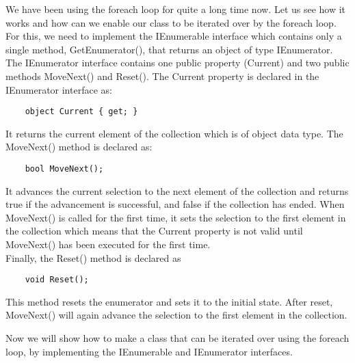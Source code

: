 We have been using the foreach loop for quite a long time now. Let us see how it works and how can we enable our
class to be iterated over by the foreach loop. For this, we need to implement the IEnumerable interface which
contains only a single method, GetEnumerator(), that returns an object of type IEnumerator. The IEnumerator
interface contains one public property (Current) and two public methods MoveNext() and Reset(). The Current
property is declared in the IEnumerator interface as:

\begin{lstlisting}
    object Current { get; }    
\end{lstlisting}

It returns the current element of the collection which is of object data type. The MoveNext() method is declared as:

\begin{lstlisting}
    bool MoveNext();    
\end{lstlisting}

It advances the current selection to the next element of the collection and returns true if the advancement is
successful, and false if the collection has ended. When MoveNext() is called for the first time, it sets the selection
to the first element in the collection which means that the Current property is not valid until MoveNext() has been
executed for the first time.\\

Finally, the Reset() method is declared as

\begin{lstlisting}
    void Reset();    
\end{lstlisting}

This method resets the enumerator and sets it to the initial state. After reset, MoveNext() will again advance the
selection to the first element in the collection.

Now we will show how to make a class that can be iterated over using the foreach loop, by implementing the
IEnumerable and IEnumerator interfaces.

